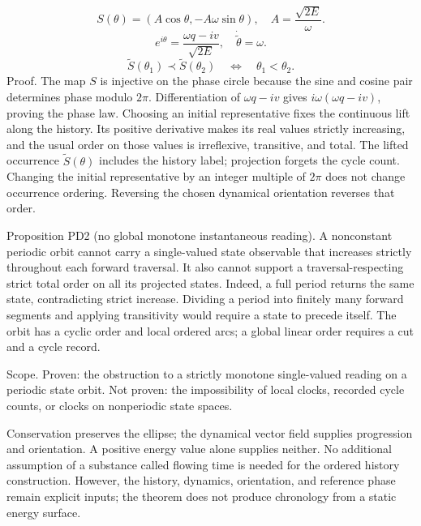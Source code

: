 \documentclass[aip,adv,preprint,floatfix]{revtex4-2}
\begin{document}
\begin{equation}
S(\theta)=(A\cos\theta,-A\omega\sin\theta),\quad A=\frac{\sqrt{2E}}{\omega}.
\end{equation}
\begin{equation}
e^{i\theta}=\frac{\omega q-i v}{\sqrt{2E}},\quad\dot{\widetilde\theta}=\omega.
\end{equation}
\begin{equation}
\widetilde S(\theta_1)\prec\widetilde S(\theta_2)\quad\Longleftrightarrow\quad\theta_1<\theta_2.
\end{equation}
Proof. The map $S$ is injective on the phase circle because the sine and cosine pair determines phase modulo $2\pi$. Differentiation of $\omega q-i v$ gives $i\omega(\omega q-i v)$, proving the phase law. Choosing an initial representative fixes the continuous lift along the history. Its positive derivative makes its real values strictly increasing, and the usual order on those values is irreflexive, transitive, and total. The lifted occurrence $\widetilde S(\theta)$ includes the history label; projection forgets the cycle count. Changing the initial representative by an integer multiple of $2\pi$ does not change occurrence ordering. Reversing the chosen dynamical orientation reverses that order.

Proposition PD2 (no global monotone instantaneous reading). A nonconstant periodic orbit cannot carry a single-valued state observable that increases strictly throughout each forward traversal. It also cannot support a traversal-respecting strict total order on all its projected states. Indeed, a full period returns the same state, contradicting strict increase. Dividing a period into finitely many forward segments and applying transitivity would require a state to precede itself. The orbit has a cyclic order and local ordered arcs; a global linear order requires a cut and a cycle record.

Scope. Proven: the obstruction to a strictly monotone single-valued reading on a periodic state orbit. Not proven: the impossibility of local clocks, recorded cycle counts, or clocks on nonperiodic state spaces.

Conservation preserves the ellipse; the dynamical vector field supplies progression and orientation. A positive energy value alone supplies neither. No additional assumption of a substance called flowing time is needed for the ordered history construction. However, the history, dynamics, orientation, and reference phase remain explicit inputs; the theorem does not produce chronology from a static energy surface.
\end{document}
